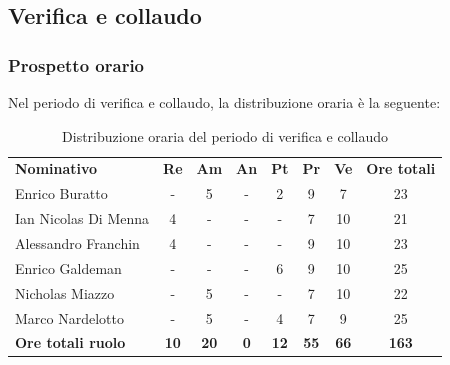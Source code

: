 \documentclass[../piano-di-progetto.tex]{subfiles}
\begin{document}
  \subsection{Verifica e collaudo}

  \subsubsection{Prospetto orario}
  Nel periodo di verifica e collaudo, la distribuzione oraria è la seguente:
  \begin{table}[H]
    \centering
    \begin{tabular}{lccccccc}
      \rowcolor{lightgray}
      \textbf{Nominativo}        & \textbf{Re} & \textbf{Am}  & \textbf{An} & \textbf{Pt}  & \textbf{Pr}   & \textbf{Ve} & \textbf{Ore totali} \\
      Enrico Buratto            & -           & 5           & -          & 2           & 9           & 7           & 23           \\
      Ian Nicolas Di Menna      & 4           & -           & -          & -           & 7           & 10          & 21           \\
      Alessandro Franchin       & 4           & -           & -          & -           & 9           & 10          & 23           \\
      Enrico Galdeman           & -           & -           & -          & 6           & 9           & 10          & 25           \\
      Nicholas Miazzo           & -           & 5           & -          & -           & 7           & 10          & 22           \\
      Marco Nardelotto          & -           & 5           & -          & 4           & 7           & 9           & 25           \\
      \textbf{Ore totali ruolo} & \textbf{10} & \textbf{20} & \textbf{0} & \textbf{12} & \textbf{55} & \textbf{66} & \textbf{163} 
    \end{tabular}
    \caption{Distribuzione oraria del periodo di verifica e collaudo}
  \end{table}
\end{document}
